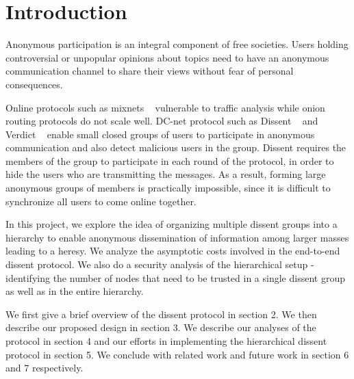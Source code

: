 \section{Introduction}

Anonymous participation is an integral component of free societies. Users holding controversial or unpopular opinions about topics need to have an anonymous communication channel to share their views without fear of personal consequences.

Online protocols such as mixnets ~\cite{chaum-dc,chaum-mix} vulnerable to traffic analysis while onion routing protocols do not scale well. DC-net protocol such as Dissent ~\cite{dissent} and Verdict ~\cite{verdict} enable small closed groups of users to participate in anonymous communication and also detect malicious users in the group. Dissent requires the members of the group to participate in each round of the protocol, in order to hide the users who are transmitting the messages. As a result, forming large anonymous groups of members is practically impossible, since it is difficult to synchronize all users to come online together.

In this project, we explore the idea of organizing multiple dissent groups into a hierarchy to enable anonymous dissemination of information among larger masses leading to a heresy. We analyze the asymptotic costs involved in the end-to-end dissent protocol. We also do a security analysis of the hierarchical setup - identifying the number of nodes that need to be trusted in a single dissent group as well as in the entire hierarchy.

We first give a brief overview of the dissent protocol in section 2. We then describe our proposed design in section 3. We describe our analyses of the protocol in section 4 and our efforts in implementing the hierarchical dissent protocol in section 5. We conclude with related work and future work in section 6 and 7 respectively.

